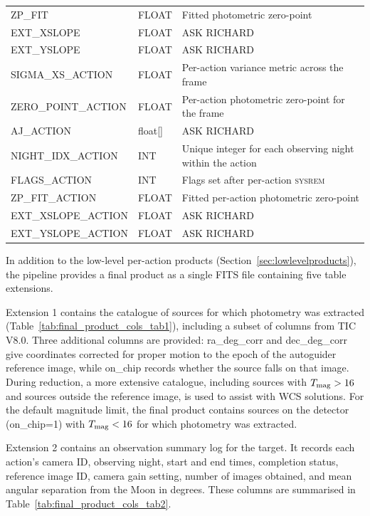 \documentclass[fleqn,usenatbib]{mnras}
\begin{document}
\begin{table}
\begin{tabularx}{\textwidth}{@{}ll>{\raggedright\arraybackslash}X@{}}
    ZP\_FIT & FLOAT & Fitted photometric zero-point \\
    EXT\_XSLOPE & FLOAT & ASK RICHARD \\
    EXT\_YSLOPE & FLOAT & ASK RICHARD \\
    SIGMA\_XS\_ACTION & FLOAT & Per-action variance metric across the frame \\
    ZERO\_POINT\_ACTION & FLOAT & Per-action photometric zero-point for the frame \\
    AJ\_ACTION & float[] & ASK RICHARD \\
    NIGHT\_IDX\_ACTION & INT & Unique integer for each observing night within the action \\
    FLAGS\_ACTION & INT & Flags set after per-action \textsc{sysrem} \\
    ZP\_FIT\_ACTION & FLOAT & Fitted per-action photometric zero-point \\
    EXT\_XSLOPE\_ACTION & FLOAT & ASK RICHARD \\
    EXT\_YSLOPE\_ACTION & FLOAT & ASK RICHARD \\
    \bottomrule
    \end{tabularx}
\end{table}

In addition to the low-level per-action products (Section~\ref{sec:lowlevelproducts}), the pipeline provides a final product as a single FITS file containing five table extensions.

Extension 1 contains the catalogue of sources for which photometry was extracted (Table~\ref{tab:final_product_cols_tab1}), including a subset of columns from TIC V8.0. Three additional columns are provided: ra\_deg\_corr and dec\_deg\_corr give coordinates corrected for proper motion to the epoch of the autoguider reference image, while on\_chip records whether the source falls on that image. During reduction, a more extensive catalogue, including sources with $T_{\rm mag}>16$ and sources outside the reference image, is used to assist with WCS solutions. For the default magnitude limit, the final product contains sources on the detector (on\_chip=1) with $T_{\rm mag}<16$ for which photometry was extracted.

Extension 2 contains an observation summary log for the target. It records each action's camera ID, observing night, start and end times, completion status, reference image ID, camera gain setting, number of images obtained, and mean angular separation from the Moon in degrees. These columns are summarised in Table~\ref{tab:final_product_cols_tab2}.
\end{document}
